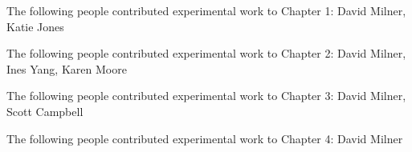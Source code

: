\noindent The following people contributed experimental work to Chapter 1: David Milner, Katie Jones

\noindent The following people contributed experimental work to Chapter 2: David Milner, Ines Yang, Karen Moore

\noindent The following people contributed experimental work to Chapter 3: David Milner, Scott Campbell

\noindent The following people contributed experimental work to Chapter 4: David Milner 
